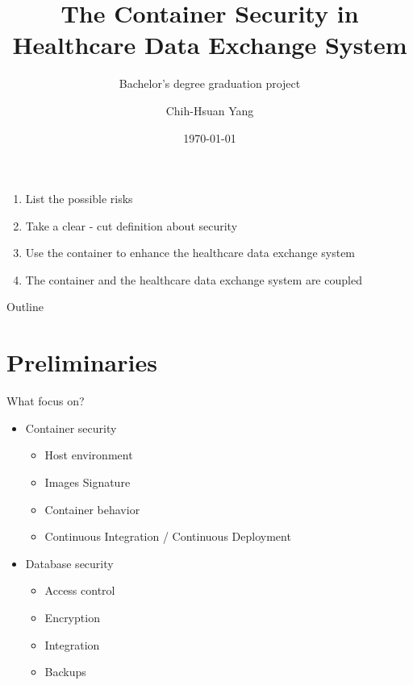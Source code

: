 \documentclass{beamer}
\title{The Container Security in Healthcare Data Exchange System}
\subtitle{Bachelor's degree graduation project}
\author{Chih-Hsuan Yang}
\institute{National Sun Yat-sen University\\
Advisor: Chun-I Fan
}
\date{\today}
\begin{document}
\begin{CJK*}{UTF8}{bsmi}

  \begin{frame}
    \titlepage
  \end{frame}

  \begin{frame}
    \begin{enumerate}
      \item List the possible risks
      \item Take a clear - cut definition about security
      \item Use the container to {\color{secureColor} enhance} the healthcare data exchange system
      \item The container and the healthcare data exchange system are coupled
    \end{enumerate}
  \end{frame}

  \begin{frame}{Outline}
    \begin{multicols}{2}
      \tableofcontents
    \end{multicols}
  \end{frame}

  \section{Preliminaries}
  \begin{frame}{What focus on?}
    \begin{multicols*}{2}
      \begin{itemize}
        \item Container security
              \begin{itemize}
                \item Host environment
                \item Images Signature
                \item Container behavior
                \item Continuous Integration / Continuous Deployment
              \end{itemize}
      \end{itemize}
      \begin{itemize}
        \item Database security
              \begin{itemize}
                \item Access control
                \item Encryption
                \item Integration
                \item Backups
              \end{itemize}
      \end{itemize}
    \end{multicols*}
  \end{frame}


\end{CJK*}
\end{document}
